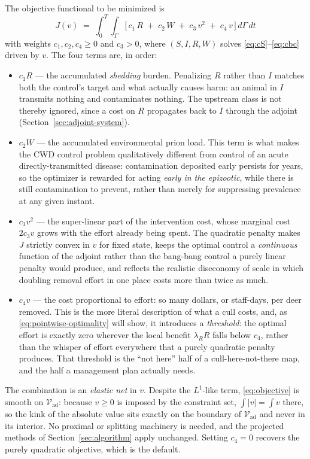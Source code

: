 \documentclass[11pt]{article}
\newcommand{\Vad}{\mathcal{V}_{\mathrm{ad}}}
\begin{document}
The objective functional to be minimized is
\begin{equation}
\boxed{\;J(v) \;=\; \int_0^T\!\!\int_\Gamma \Big[\,c_1\,R \;+\; c_2\,W \;+\; c_3\,v^2 \;+\; c_4\,v\,\Big]\,d\Gamma\,dt\;}
\label{eq:objective}
\end{equation}
with weights $c_1,c_2,c_4\ge 0$ and $c_3>0$, where $(S,I,R,W)$ solves \eqref{eq:cS}--\eqref{eq:cbc} driven by $v$. The four terms are, in order:
\begin{itemize}
\item $c_1 R$ --- the accumulated \emph{shedding} burden. Penalizing $R$ rather than $I$ matches both the control's target and what actually causes harm: an animal in $I$ transmits nothing and contaminates nothing. The upstream class is not thereby ignored, since a cost on $R$ propagates back to $I$ through the adjoint (Section~\ref{sec:adjoint-system}).
\item $c_2 W$ --- the accumulated environmental prion load. This term is what makes the CWD control problem qualitatively different from control of an acute directly-transmitted disease: contamination deposited early persists for years, so the optimizer is rewarded for acting \emph{early in the epizootic}, while there is still contamination to prevent, rather than merely for suppressing prevalence at any given instant.
\item $c_3 v^2$ --- the super-linear part of the intervention cost, whose marginal cost $2c_3v$ grows with the effort already being spent. The quadratic penalty makes $J$ strictly convex in $v$ for fixed state, keeps the optimal control a \emph{continuous} function of the adjoint rather than the bang-bang control a purely linear penalty would produce, and reflects the realistic diseconomy of scale in which doubling removal effort in one place costs more than twice as much.
\item $c_4 v$ --- the cost proportional to effort: so many dollars, or staff-days, per deer removed. This is the more literal description of what a cull costs, and, as \eqref{eq:pointwise-optimality} will show, it introduces a \emph{threshold}: the optimal effort is exactly zero wherever the local benefit $\lambda_R R$ falls below $c_4$, rather than the whisper of effort everywhere that a purely quadratic penalty produces. That threshold is the ``not here'' half of a cull-here-not-there map, and the half a management plan actually needs.
\end{itemize}
The combination is an \emph{elastic net} in $v$. Despite the $L^1$-like term, \eqref{eq:objective} is smooth on $\Vad$: because $v\ge0$ is imposed by the constraint set, $\int|v| = \int v$ there, so the kink of the absolute value sits exactly on the boundary of $\Vad$ and never in its interior. No proximal or splitting machinery is needed, and the projected methods of Section~\ref{sec:algorithm} apply unchanged. Setting $c_4=0$ recovers the purely quadratic objective, which is the default.
\end{document}
